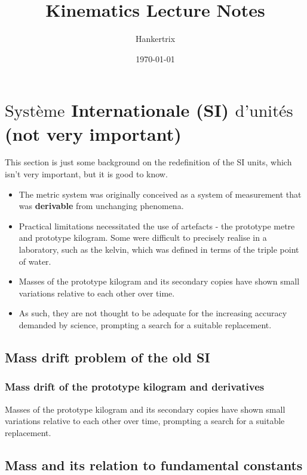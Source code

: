 \documentclass[11pt]{article}
\author{Hankertrix}
\date{\today}
\title{Kinematics Lecture Notes}
\begin{document}
\maketitle
\setcounter{tocdepth}{2}
\tableofcontents

\newpage

\section{\(\text{Syst\`eme}\) Internationale (SI) \(\text{d'unit\'es}\) (not very important)}
\label{sec:org50ab051}

This section is just some background on the redefinition of the SI units, which isn't very important, but it is good to know.

\begin{itemize}
\item The metric system was originally conceived as a system of measurement that was \textbf{derivable} from unchanging phenomena.
\item Practical limitations necessitated the use of artefacts - the prototype metre and prototype kilogram. Some were difficult to precisely realise in a laboratory, such as the kelvin, which was defined in terms of the triple point of water.
\item Masses of the prototype kilogram and its secondary copies have shown small variations relative to each other over time.
\item As such, they are not thought to be adequate for the increasing accuracy demanded by science, prompting a search for a suitable replacement.
\end{itemize}


\subsection{Mass drift problem of the old SI}
\label{sec:orgef902c9}

\subsubsection{Mass drift of the prototype kilogram and derivatives}
\label{sec:orga62eb5d}
Masses of the prototype kilogram and its secondary copies have shown small variations relative to each other over time, prompting a search for a suitable replacement.

\subsection{Mass and its relation to fundamental constants}
\label{sec:orgac7b10e}
\end{document}
